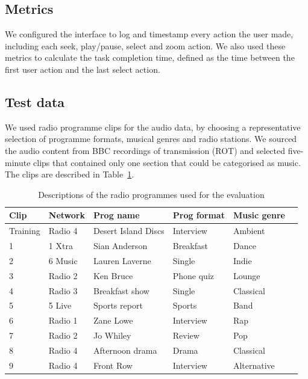 \subsection{Metrics}
We configured the interface to log and timestamp every action the user made, including each seek, play/pause, select
and zoom action. We also used these metrics to calculate the task completion time, defined as the time between the
first user action and the last select action.


\subsection{Test data}
We used radio programme clips for the audio data, by choosing a representative selection of programme formats, musical
genres and radio stations.  We sourced the audio content from BBC recordings of transmission (ROT) and selected
five-minute clips that contained only one section that could be categorised as music.  The clips are described in
Table~\ref{tab:clips}.


\begin{table}[htbp]
  \begin{center}
    {\small
    \begin{tabular}{l l l l l l}
      \hline
      \textbf{Clip} & \textbf{Network} & \textbf{Prog name} & \textbf{Prog format} & \textbf{Music genre} \\ \hline
      Training & Radio 4 & Desert Island Discs & Interview & Ambient \\
      1 & 1 Xtra & Sian Anderson & Breakfast & Dance \\
      2 & 6 Music & Lauren Laverne & Single & Indie \\
      3 & Radio 2 & Ken Bruce & Phone quiz & Lounge \\
      4 & Radio 3 & Breakfast show & Single & Classical \\
      5 & 5 Live & Sports report & Sports & Band \\
      6 & Radio 1 & Zane Lowe & Interview & Rap \\
      7 & Radio 2 & Jo Whiley & Review & Pop \\
      8 & Radio 4 & Afternoon drama & Drama & Classical \\
      9 & Radio 4 & Front Row & Interview & Alternative \\ \hline
    \end{tabular}
  }
  \end{center}
  \caption{Descriptions of the radio programmes used for the evaluation}
  \label{tab:clips}
\end{table}

